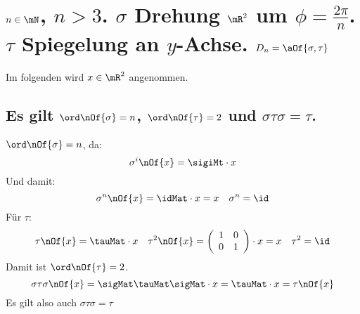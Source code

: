 \section{$n\in \mN$, $n > 3$. $\sigma$ Drehung $\mR^2$ um $\phi = \frac{2\pi}{n}$. $\tau$ Spiegelung an $y$-Achse. $D_n = \aOf{\sigma,\tau}$}
Im folgenden wird $x\in \mR^2$ angenommen.
\subsection{Es gilt $\ord\nOf{\sigma} = n$, $\ord\nOf{\tau} = 2$ und $\sigma\tau\sigma = \tau$.}
$\ord\nOf{\sigma} = n$, da:
\begin{equation}
	\sigma^i\nOf{x} = \sigiMt \cdot x
\end{equation}
Und damit:
\begin{equation}
	\sigma^n\nOf{x} = \idMat \cdot x = x \quad \sigma^n = \id
\end{equation}
Für $\tau$:
\begin{equation}
	\tau\nOf{x} = \tauMat\cdot x \quad \tau^2\nOf{x} = \left(\begin{array}{r r} 1 & 0 \\ 0 & 1\end{array}\right)\cdot x = x \quad \tau^2 = \id
\end{equation}
Damit ist $\ord\nOf{\tau} = 2$.
\begin{equation}
	\sigma\tau\sigma\nOf{x} = \sigMat \tauMat \sigMat \cdot x = \tauMat \cdot x = \tau\nOf{x}
\end{equation}
Es gilt also auch $\sigma\tau\sigma = \tau$


